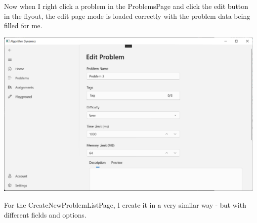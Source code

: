 \documentclass[a4paper]{report}
\begin{document}
Now when I right click a problem in the ProblemsPage and click the edit button in the flyout, the edit page mode is loaded correctly with the problem data being filled for me.

\includegraphics[width=\textwidth, height=\textheight, keepaspectratio]{CreateNewProblemPage-Edit}

For the CreateNewProblemListPage, I create it in a very similar way - but with different fields and options.
\end{document}
